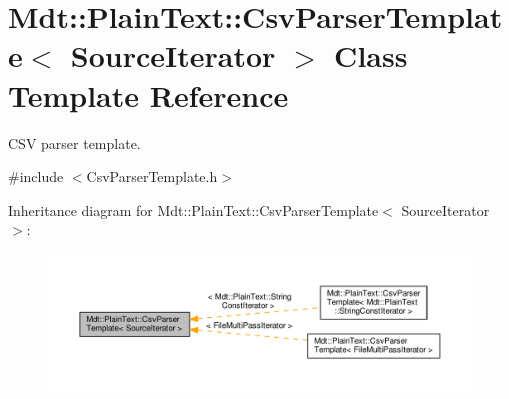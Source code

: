 \hypertarget{class_mdt_1_1_plain_text_1_1_csv_parser_template}{}\section{Mdt\+:\+:Plain\+Text\+:\+:Csv\+Parser\+Template$<$ Source\+Iterator $>$ Class Template Reference}
\label{class_mdt_1_1_plain_text_1_1_csv_parser_template}


C\+SV parser template.  




{\ttfamily \#include $<$Csv\+Parser\+Template.\+h$>$}



Inheritance diagram for Mdt\+:\+:Plain\+Text\+:\+:Csv\+Parser\+Template$<$ Source\+Iterator $>$\+:
\nopagebreak
\begin{figure}[H]
\begin{center}
\leavevmode
\includegraphics[width=350pt]{class_mdt_1_1_plain_text_1_1_csv_parser_template__inherit__graph}
\end{center}
\end{figure}
